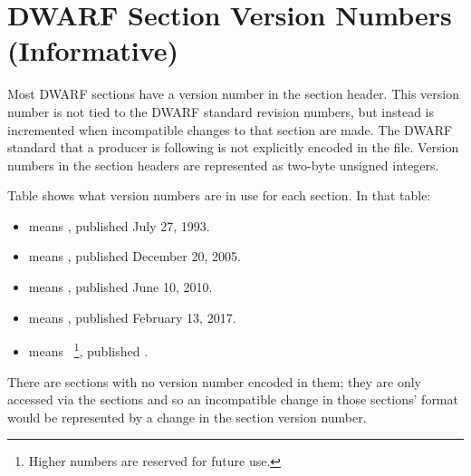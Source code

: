 
\chapter[Section Version Numbers (Informative)]{DWARF Section Version Numbers (Informative)}
\label{app:dwarfsectionversionnumbersinformative}

Most DWARF sections have a version number in the section
header. This version number is not tied to the DWARF standard
revision numbers, but instead is incremented when incompatible
changes to that section are made. The DWARF standard that
a producer is following is not explicitly encoded in the
file. Version numbers in the section headers are represented
\bb
as two-byte unsigned integers. 
\eb

Table 
shows what version
numbers are in use for each section. In that table:
\begin{itemize}
\setlength{\itemsep}{0em}
\item  {} means , published July 27, 1993.
\item  {} means , published December 20, 2005.
\item  {} means , published June 10, 2010.
\item  {} means , published February 13, 2017.
\item  

		\bb
		 means\ \eb
		    \footnote{
				Higher numbers are reserved for future use.},  
			published .

\end{itemize}

There are sections with no version number encoded in them;
they are only accessed via the 
\dotdebuginfo{} 
sections and so an incompatible change in those sections'
format would be represented by a change in the 
\dotdebuginfo{} section version number.

